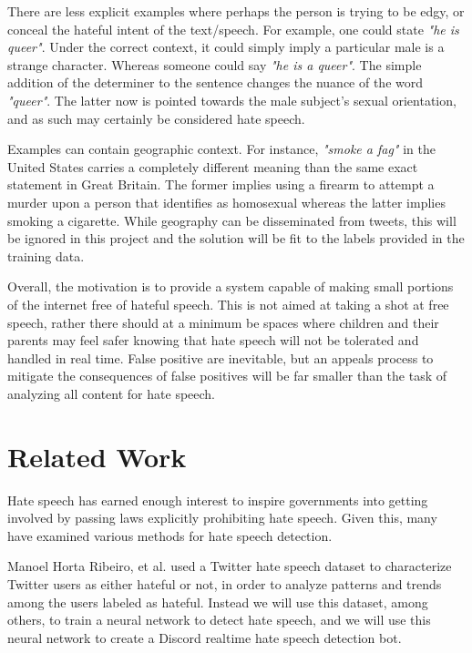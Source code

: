 \documentclass[conference]{sig-alternate-05-2015}
\begin{document}
There are less explicit examples where perhaps the person is trying to be edgy, or conceal the hateful intent of the text/speech.  For example, one could state \textit{"he is queer"}.  Under the correct context, it could simply imply a particular male is a strange character.  Whereas someone could say \textit{"he is a queer"}.  The simple addition of the determiner to the sentence changes the nuance of the word \textit{"queer"}.  The latter now is pointed towards the male subject's sexual orientation, and as such may certainly be considered hate speech.

Examples can contain geographic context.  For instance, \textit{"smoke a fag"} in the United States carries a completely different meaning than the same exact statement in Great Britain.  The former implies using a firearm to attempt a murder upon a person that identifies as homosexual whereas the latter implies smoking a cigarette.  While geography can be disseminated from tweets, this will be ignored in this project and the solution will be fit to the labels provided in the training data.

Overall, the motivation is to provide a system capable of making small portions of the internet free of hateful speech.  This is not aimed at taking a shot at free speech, rather there should at a minimum be spaces where children and their parents may feel safer knowing that hate speech will not be tolerated and handled in real time.  False positive are inevitable, but an appeals process to mitigate the consequences of false positives will be far smaller than the task of analyzing all content for hate speech.

\section{Related Work}\label{sec:related}

Hate speech has earned enough interest to inspire governments into getting involved\cite{Davidsonetal.} by passing laws explicitly prohibiting hate speech.  Given this, many have examined various methods for hate speech detection.

Manoel Horta Ribeiro, et al.\cite{HatefulUsersTwitter}\cite{ribeiro2017like} used a Twitter hate speech dataset to characterize Twitter users as either hateful or not, in order to analyze patterns and trends among the users labeled as hateful. Instead we will use this dataset, among others, to train a neural network to detect hate speech, and we will use this neural network to create a Discord realtime hate speech detection bot.
\end{document}
